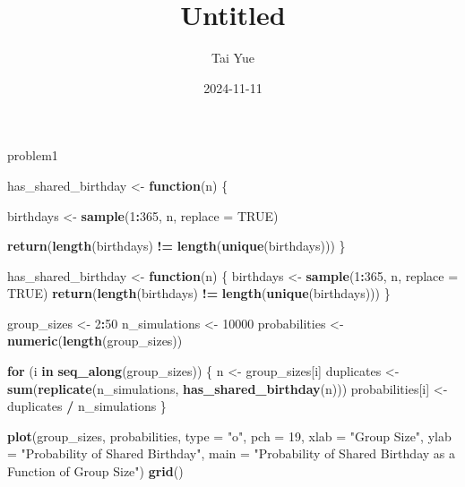 \documentclass[
]{article}
\title{Untitled}
\author{Tai Yue}
\date{2024-11-11}
\newenvironment{Shaded}{\begin{snugshade}}{\end{snugshade}}
\newcommand{\AttributeTok}[1]{\textcolor[rgb]{0.13,0.29,0.53}{#1}}
\newcommand{\ConstantTok}[1]{\textcolor[rgb]{0.56,0.35,0.01}{#1}}
\newcommand{\ControlFlowTok}[1]{\textcolor[rgb]{0.13,0.29,0.53}{\textbf{#1}}}
\newcommand{\DecValTok}[1]{\textcolor[rgb]{0.00,0.00,0.81}{#1}}
\newcommand{\FunctionTok}[1]{\textcolor[rgb]{0.13,0.29,0.53}{\textbf{#1}}}
\newcommand{\NormalTok}[1]{#1}
\newcommand{\OtherTok}[1]{\textcolor[rgb]{0.56,0.35,0.01}{#1}}
\newcommand{\SpecialCharTok}[1]{\textcolor[rgb]{0.81,0.36,0.00}{\textbf{#1}}}
\newcommand{\StringTok}[1]{\textcolor[rgb]{0.31,0.60,0.02}{#1}}
\begin{document}
\maketitle

problem1

\begin{Shaded}
\begin{Highlighting}[]
\NormalTok{has\_shared\_birthday }\OtherTok{\textless{}{-}} \ControlFlowTok{function}\NormalTok{(n) \{}
 
\NormalTok{  birthdays }\OtherTok{\textless{}{-}} \FunctionTok{sample}\NormalTok{(}\DecValTok{1}\SpecialCharTok{:}\DecValTok{365}\NormalTok{, n, }\AttributeTok{replace =} \ConstantTok{TRUE}\NormalTok{)}
  
  
  \FunctionTok{return}\NormalTok{(}\FunctionTok{length}\NormalTok{(birthdays) }\SpecialCharTok{!=} \FunctionTok{length}\NormalTok{(}\FunctionTok{unique}\NormalTok{(birthdays)))}
\NormalTok{\}}
\end{Highlighting}
\end{Shaded}

\begin{Shaded}
\begin{Highlighting}[]
\NormalTok{has\_shared\_birthday }\OtherTok{\textless{}{-}} \ControlFlowTok{function}\NormalTok{(n) \{}
\NormalTok{  birthdays }\OtherTok{\textless{}{-}} \FunctionTok{sample}\NormalTok{(}\DecValTok{1}\SpecialCharTok{:}\DecValTok{365}\NormalTok{, n, }\AttributeTok{replace =} \ConstantTok{TRUE}\NormalTok{)}
  \FunctionTok{return}\NormalTok{(}\FunctionTok{length}\NormalTok{(birthdays) }\SpecialCharTok{!=} \FunctionTok{length}\NormalTok{(}\FunctionTok{unique}\NormalTok{(birthdays)))}
\NormalTok{\}}


\NormalTok{group\_sizes }\OtherTok{\textless{}{-}} \DecValTok{2}\SpecialCharTok{:}\DecValTok{50}
\NormalTok{n\_simulations }\OtherTok{\textless{}{-}} \DecValTok{10000}
\NormalTok{probabilities }\OtherTok{\textless{}{-}} \FunctionTok{numeric}\NormalTok{(}\FunctionTok{length}\NormalTok{(group\_sizes))}


\ControlFlowTok{for}\NormalTok{ (i }\ControlFlowTok{in} \FunctionTok{seq\_along}\NormalTok{(group\_sizes)) \{}
\NormalTok{  n }\OtherTok{\textless{}{-}}\NormalTok{ group\_sizes[i]}
\NormalTok{  duplicates }\OtherTok{\textless{}{-}} \FunctionTok{sum}\NormalTok{(}\FunctionTok{replicate}\NormalTok{(n\_simulations, }\FunctionTok{has\_shared\_birthday}\NormalTok{(n)))}
\NormalTok{  probabilities[i] }\OtherTok{\textless{}{-}}\NormalTok{ duplicates }\SpecialCharTok{/}\NormalTok{ n\_simulations}
\NormalTok{\}}


\FunctionTok{plot}\NormalTok{(group\_sizes, probabilities, }\AttributeTok{type =} \StringTok{"o"}\NormalTok{, }\AttributeTok{pch =} \DecValTok{19}\NormalTok{,}
     \AttributeTok{xlab =} \StringTok{"Group Size"}\NormalTok{, }\AttributeTok{ylab =} \StringTok{"Probability of Shared Birthday"}\NormalTok{,}
     \AttributeTok{main =} \StringTok{"Probability of Shared Birthday as a Function of Group Size"}\NormalTok{)}
\FunctionTok{grid}\NormalTok{()}
\end{Highlighting}
\end{Shaded}
\end{document}
